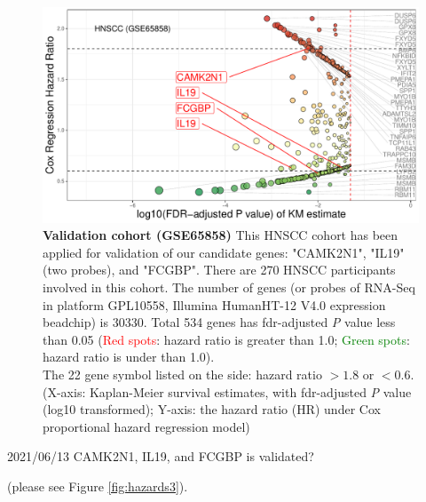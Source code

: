 \documentclass[preprint,12pt]{elsarticle}
\newcommand{\bcaption}[2]{\caption{\textbf{#1} #2}}
\newenvironment{MyColorPar}[1]{%
    \leavevmode\color{#1}\ignorespaces%
}{%
}%
\begin{document}
\begin{MyColorPar}{blue}
\begin{figure}
    \centering
    \includegraphics[width=13cm]{Rplot_GSE65858_CoxHR_CAMK2N1_top3FDRKM.pdf}
    \bcaption{Validation cohort (GSE65858)}{
    This HNSCC cohort has been applied for validation of our candidate genes: "CAMK2N1", "IL19" (two probes), and "FCGBP".
    There are 270 HNSCC participants involved in this cohort.
    The number of genes (or probes of RNA-Seq in platform GPL10558, Illumina HumanHT-12 V4.0 expression beadchip) is 30330.
    Total 534 genes has \acrshort{fdr}-adjusted \textit{P} value less than 0.05
    (\textcolor{red}{Red spots}: hazard ratio is greater than 1.0;
    \textcolor{green}{Green spots}: hazard ratio is under than 1.0).\\
    The 22 gene symbol listed on the side: hazard ratio $> 1.8$ or $< 0.6$.\\
    (X-axis: Kaplan-Meier survival estimates, with \acrshort{fdr}-adjusted \textit{P} value (log10 transformed);
    Y-axis: the hazard ratio (HR) under Cox proportional hazard regression model)
    }
    \label{fig:hazards534}
\end{figure}

2021/06/13
CAMK2N1, IL19, and FCGBP is validated?

(please see Figure \ref{fig:hazards3}).



\end{MyColorPar}
\end{document}
